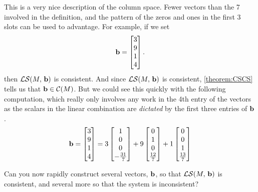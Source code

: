 \documentclass{ximera}
\begin{document}
\begin{example}
  This is a very nice description of the column space.  Fewer vectors
  than the 7 involved in the definition, and the pattern of the zeros
  and ones in the first 3 slots can be used to advantage.  For
  example, if we set
  \[
    \mathbf{b}=\begin{bmatrix}3\\9\\1\\4\end{bmatrix}.
  \]
  then $\mathcal{LS}\!\left(M,\,\mathbf{b}\right)$ is consistent.  And since
  $\mathcal{LS}\!\left(M,\,\mathbf{b}\right)$ is consistent, \ref{theorem:CSCS} tells
  us that $\mathbf{b}\in\mathcal{C}\!\left(M\right)$.  But we could see this quickly with
  the following computation, which really only involves any work in
  the 4th entry of the vectors as the scalars in the linear
  combination are \textit{dictated} by the first three entries of
  $\mathbf{b}$.
  \[
    \mathbf{b}=\begin{bmatrix}3\\9\\1\\4\end{bmatrix}=
    3\begin{bmatrix}1\\0\\0\\-\frac{31}{7}\end{bmatrix}+
    9\begin{bmatrix}0\\1\\0\\\frac{12}{7}\end{bmatrix}+
    1\begin{bmatrix}0\\0\\1\\\frac{13}{7}\end{bmatrix}
  \]

  Can you now rapidly construct several vectors, $\mathbf{b}$, so that
  $\mathcal{LS}\!\left(M,\,\mathbf{b}\right)$ is consistent, and several more so that
  the system is inconsistent?
\end{example}
\end{document}
